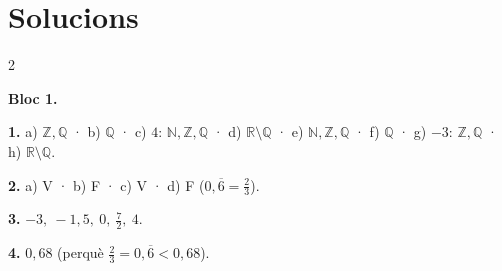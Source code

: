 \documentclass[13pt,a4paper]{extarticle}
\begin{document}
\section*{Solucions}
\small\begin{multicols}{2}


\textbf{Bloc 1.}\par
\par\noindent\begin{minipage}{\linewidth}
\textbf{1.} a) $\mathbb{Z},\mathbb{Q}$ · b) $\mathbb{Q}$ · c) $4$: $\mathbb{N},\mathbb{Z},\mathbb{Q}$ · d) $\mathbb{R}\setminus\mathbb{Q}$ · e) $\mathbb{N},\mathbb{Z},\mathbb{Q}$ · f) $\mathbb{Q}$ · g) $-3$: $\mathbb{Z},\mathbb{Q}$ · h) $\mathbb{R}\setminus\mathbb{Q}$.\par
\end{minipage}\par\vspace{1.6mm}
\par\noindent\begin{minipage}{\linewidth}
\textbf{2.} a) V · b) F · c) V · d) F ($0{,}\overline6=\tfrac23$).\par
\end{minipage}\par\vspace{1.6mm}
\par\noindent\begin{minipage}{\linewidth}
\textbf{3.} $-3,\ -1{,}5,\ 0,\ \tfrac72,\ 4$.\par
\end{minipage}\par\vspace{1.6mm}
\par\noindent\begin{minipage}{\linewidth}
\textbf{4.} $0{,}68$ (perquè $\tfrac23=0{,}\overline6<0{,}68$).\par


\end{minipage}
\end{multicols}
\end{document}
